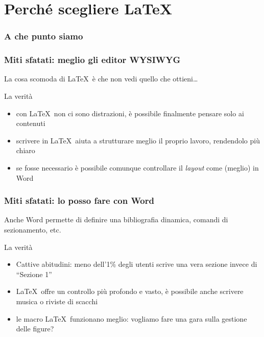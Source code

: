 \documentclass[svgnames,%
	ucs,%
	pdftex]{guitbeamer}
\begin{document}
\section{Perch\'e scegliere \LaTeX}
\begin{frame}
  \frametitle{A che punto siamo}
\end{frame}
\begin{frame}
  \frametitle{Miti sfatati: meglio gli editor WYSIWYG}
	La cosa scomoda di \LaTeX\ \`e che non vedi quello che ottieni\dots
  \medskip
	\begin{block}{La verit\`a}
		\begin{itemize}
			\item con \LaTeX\ non ci sono distrazioni, \`e possibile finalmente pensare solo ai contenuti
			\item scrivere in \LaTeX\ aiuta a strutturare meglio il proprio lavoro, rendendolo pi\`u chiaro
			\item se fosse necessario \`e possibile comunque controllare il \textit{layout} come (meglio) in Word
		\end{itemize}
	\end{block}
\end{frame}
\begin{frame}
  \frametitle{Miti sfatati: lo posso fare con Word}
	Anche Word permette di definire una bibliografia dinamica, comandi di sezionamento, etc.
  \medskip
	\begin{block}{La verit\`a}
		\begin{itemize}
			\item Cattive abitudini: meno dell'1\% degli utenti scrive una vera sezione invece di ``Sezione 1''
			\item \LaTeX\ offre un controllo pi\`u profondo e vasto, \`e possibile anche scrivere musica o riviste di scacchi
			\item le macro \LaTeX\ funzionano meglio: vogliamo fare una gara sulla gestione delle figure?
		\end{itemize}
	\end{block}
\end{frame}
\end{document}

